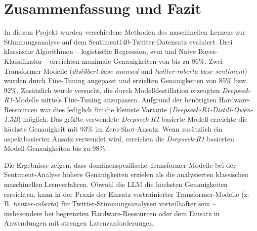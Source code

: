 \section{Zusammenfassung und Fazit}

In diesem Projekt wurden verschiedene Methoden des maschinellen Lernens zur Stimmungsanalyse auf dem Sentiment140-Twitter-Datensatz evaluiert.
Drei klassische Algorithmen – logistische Regression, \gls{svm} und Naive Bayes-Klassifikator – erreichten maximale Genauigkeiten von bis zu 86\%.
Zwei Transformer-Modelle (\emph{distilbert-base-uncased} und \emph{twitter-roberta-base-sentiment}) wurden durch Fine-Tuning angepasst und erzielten Genauigkeiten von 85\% bzw. 92\%.
Zusätzlich wurde versucht, die durch Modelldestillation erzeugten \emph{Deepseek-R1}-Modelle mittels Fine-Tuning anzupassen. Aufgrund der benötigten Hardware-Ressourcen war dies lediglich für die kleinste Variante (\emph{Deepseek-R1-Distill-Qwen-1.5B}) möglich.
Das größte verwendete \emph{Deepseek-R1} basierte Modell erreichte die höchste Genauigkeit mit 93\% im Zero-Shot-Ansatz.
Wenn zusätzlich ein aspektbasierter Ansatz verwendet wird, erreichen die \emph{Deepseek-R1} basierten Modell-Genauigkeiten bis zu 98\%.

Die Ergebnisse zeigen, dass domänenspezifische Transformer-Modelle bei der Sentiment-Analyse höhere Genauigkeiten erzielen als die analysierten klassischen maschinellen Lernverfahren.
Obwohl die LLM die höchsten Genauigkeiten erreichten, kann in der Praxis der Einsatz vortrainierter Transformer-Modelle (z. B. \emph{twitter-roberta}) für Twitter-Stimmungsanalysen vorteilhafter sein – insbesondere bei begrenzten Hardware-Ressourcen oder dem Einsatz in Anwendungen mit strengen Latenzanforderungen.
